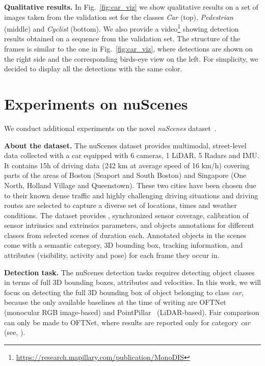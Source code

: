\documentclass[10pt,twocolumn,letterpaper]{article}
\renewcommand{\paragraph}[1]{

        \vspace{3pt}
	\noindent\textbf{#1}}
\begin{document}
\paragraph{Qualitative results.} In Fig.~\ref{fig:car_viz} we show qualitative results on a set of images taken from the validation set for the classes \textit{Car} (top), \textit{Pedestrian} (middle) and \textit{Cyclist} (bottom).
We also provide a video\footnote{\url{https://research.mapillary.com/publication/MonoDIS}} showing detection results obtained on a sequence from the validation set. The structure of the frames is similar to the one in Fig.~\ref{fig:car_viz}, where detections are shown on the right side and the corresponding birds-eye view on the left. For simplicity, we decided to display all the detections with the same color.  









\section{Experiments on nuScenes}

We conduct additional experiments on the novel \textit{nuScenes} dataset~\cite{Cae+19}.

\paragraph{About the dataset.}
The nuScenes dataset provides multimodal, street-level data collected with a car equipped with 6 cameras, 1 LiDAR, 5 Radars and IMU. It contains 15h of driving data (242 km at average speed of 16 km/h) covering parts of the areas of Boston (Seaport and South Boston) and Singapore (One North, Holland Village and Queenstown). These two cities have been chosen due to their known dense traffic and highly challenging driving situations and driving routes are selected to capture a diverse set of locations, times and weather conditions.
The dataset provides , synchronized sensor coverage, calibration of sensor intrinsics and extrinsics parameters, and objects annotations for  different classes from  selected scenes of  duration each. Annotated objects in the scenes come with a semantic category, 3D bounding box, tracking information, and attributes (visibility, activity and pose) for each frame they occur in.

\paragraph{Detection task.}
The nuScenes detection tasks requires detecting  object classes in terms of full 3D bounding boxes, attributes and velocities. 
In this work, we will focus on detecting the full 3D bounding box of object belonging to class \emph{car}, because the only available baselines at the time of writing are OFTNet (monocular RGB image-based) and PointPillar~\cite{Lang_CVPR_2019} (LiDAR-based). Fair comparison can only be made to OFTNet, where results are reported only for category \textit{car} (see, \cite{Cae+19}).
\end{document}
